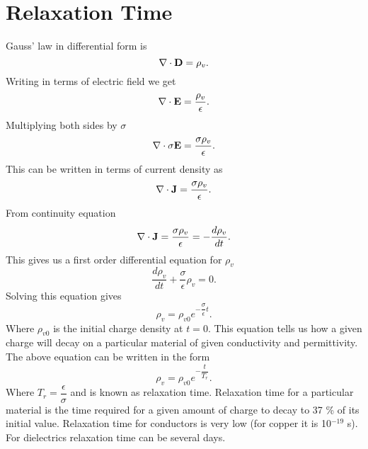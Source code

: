 \documentclass[12pt,a4paper]{article}
\begin{document}
\section{Relaxation Time}
Gauss' law in differential form is
\begin{equation}
\nabla\cdot\mathrm{\textbf D}=\rho_v.
\end{equation}
Writing in terms of electric field we get
\begin{equation}
\nabla\cdot\mathrm{\textbf E}=\dfrac{\rho_v}{\epsilon}.
\end{equation}
Multiplying both sides by $\sigma$
\begin{equation}
\nabla\cdot\sigma\mathrm{\textbf E}=\dfrac{\sigma\rho_v}{\epsilon}.
\end{equation}
This can be written in terms of current density as
\begin{equation}
\nabla\cdot\mathrm{\textbf J}=\dfrac{\sigma\rho_v}{\epsilon}.
\end{equation}
From continuity equation
\begin{equation}
\nabla\cdot\mathrm{\textbf J}=\dfrac{\sigma\rho_v}{\epsilon}=-\dfrac{d\rho_v}{dt}.
\end{equation}
This gives us a first order differential equation for $\rho_v$
\begin{equation}
\dfrac{d\rho_v}{dt}+\dfrac{\sigma}{\epsilon}\rho_v=0.
\end{equation}
Solving this equation gives
\begin{equation}
\rho_v=\rho_{v0}e^{-\dfrac{\sigma}{\epsilon}t}.
\end{equation}
Where $\rho_{v0}$ is the initial charge density at $t=0$. This equation tells us how a given charge will decay on a particular material of given conductivity and permittivity. The above equation can be written in the form
\begin{equation}
\rho_v=\rho_{v0}e^{-\dfrac{t}{T_r}}.
\end{equation}
Where $T_r=\dfrac{\epsilon}{\sigma}$ and is known as relaxation time. Relaxation time for a particular material is the time required for a given amount of charge to decay to 37 \% of its initial value. Relaxation time for conductors is very low (for copper it is 10$^{-19}$ s). For dielectrics relaxation time can be several days.
%
%
\end{document}
